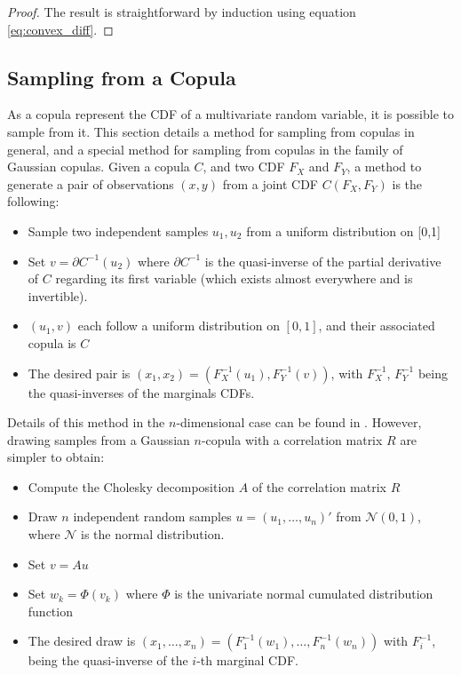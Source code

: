\begin{proof}
    The result is straightforward by induction using equation \eqref{eq:convex_diff}.
\end{proof}

\subsection{Sampling from a Copula}\label{sec:sampling_copula}
As a copula represent the CDF of a multivariate random variable, it is possible to sample from it. This section details a method for sampling from copulas in general, and a special method for sampling from copulas in the family of Gaussian copulas. Given a copula $C$, and two CDF $F_X$ and $F_Y$, a method to generate a pair of observations $(x, y)$ from a joint CDF $C(F_X, F_Y)$ is the following:

\begin{itemize}
    \item Sample two independent samples $u_1, u_2$ from a uniform distribution on [0,1]
    \item Set $v=\partial C^{-1}(u_2)$ where $\partial C^{-1}$ is the quasi-inverse of the partial derivative of $C$ regarding its first variable (which exists almost everywhere and is invertible).
    \item $(u_1, v)$ each follow a uniform distribution on $[0,1]$, and their associated copula is $C$ 
    \item The desired pair is $(x_1,x_2) = (F^{-1}_X(u_1), F^{-1}_Y(v))$, with $F_X^{-1}$, $F_Y^{-1}$ being the quasi-inverses of the marginals CDFs.
\end{itemize}

Details of this method in the $n$-dimensional case can be found in \cite{cherubini_copula_2004}. However, drawing samples from a Gaussian $n$-copula with a correlation matrix $R$ are simpler to obtain:
\begin{itemize}
    \item Compute the Cholesky decomposition $A$ of the correlation matrix $R$
    \item Draw $n$ independent random samples $u=(u_1, \dots, u_n)'$ from $\mathcal{N}(0,1)$, where $\mathcal{N}$ is the normal distribution.
    \item Set $v=Au$
    \item Set $w_k=\Phi(v_k)$ where $\Phi$ is the univariate normal cumulated distribution function
    \item The desired draw is $(x_1,\dots, x_n)=(F^{-1}_1(w_1), \dots, F^{-1}_n(w_n))$ with $F_i^{-1}$, being the quasi-inverse of the $i$-th marginal CDF.
\end{itemize}

